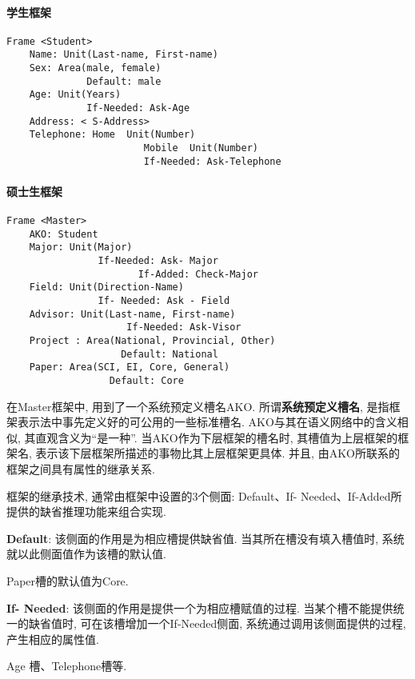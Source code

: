 \paragraph{学生框架}
\begin{Verbatim}
Frame <Student>
    Name: Unit(Last-name, First-name)
    Sex: Area(male, female)
              Default: male
    Age: Unit(Years)
              If-Needed: Ask-Age
    Address: < S-Address>
    Telephone: Home  Unit(Number)
                        Mobile  Unit(Number)
                        If-Needed: Ask-Telephone
\end{Verbatim}
\paragraph{硕士生框架}
\begin{Verbatim}
Frame <Master>
    AKO: Student
    Major: Unit(Major)
                If-Needed: Ask- Major
                       If-Added: Check-Major
    Field: Unit(Direction-Name)
                If- Needed: Ask - Field
    Advisor: Unit(Last-name, First-name)
                     If-Needed: Ask-Visor
    Project : Area(National, Provincial, Other)
                    Default: National
    Paper: Area(SCI, EI, Core, General)
                  Default: Core
\end{Verbatim}
在Master框架中, 用到了一个系统预定义槽名AKO. 所谓\textbf{系统预定义槽名}, 是指框架表示法中事先定义好的可公用的一些标准槽名. AKO与其在语义网络中的含义相似, 其直观含义为“是一种”.
当AKO作为下层框架的槽名时, 其槽值为上层框架的框架名, 表示该下层框架所描述的事物比其上层框架更具体. 并且, 由AKO所联系的框架之间具有属性的继承关系.

框架的继承技术, 通常由框架中设置的3个侧面: Default、If- Needed、If-Added所提供的缺省推理功能来组合实现.

\textbf{Default}: 该侧面的作用是为相应槽提供缺省值. 当其所在槽没有填入槽值时, 系统就以此侧面值作为该槽的默认值.
\begin{example}
  Paper槽的默认值为Core.
\end{example}

\textbf{If- Needed}: 该侧面的作用是提供一个为相应槽赋值的过程. 当某个槽不能提供统一的缺省值时, 可在该槽增加一个If-Needed侧面, 系统通过调用该侧面提供的过程, 产生相应的属性值.
\begin{example}
  Age 槽、Telephone槽等.
\end{example}

